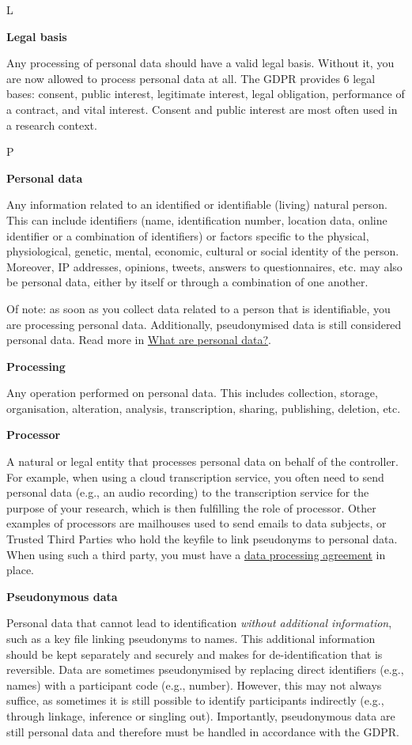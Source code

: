 \documentclass[
]{book}
\begin{document}
L

\textbf{Legal basis}

Any processing of personal data should have a valid legal basis. Without it, you are now allowed to process personal data at all. The GDPR provides 6 legal bases: consent, public interest, legitimate interest, legal obligation, performance of a contract, and vital interest. Consent and public interest are most often used in a research context.

P

\textbf{Personal data}

Any information related to an identified or identifiable (living) natural person. This can include identifiers (name, identification number, location data, online identifier or a combination of identifiers) or factors specific to the physical, physiological, genetic, mental, economic, cultural or social identity of the person. Moreover, IP addresses, opinions, tweets, answers to questionnaires, etc. may also be personal data, either by itself or through a combination of one another.

Of note: as soon as you collect data related to a person that is identifiable, you are processing personal data. Additionally, pseudonymised data is still considered personal data. Read more in \protect\hyperlink{personal-data}{What are personal data?}.

\textbf{Processing}

Any operation performed on personal data. This includes collection, storage, organisation, alteration, analysis, transcription, sharing, publishing, deletion, etc.

\textbf{Processor}

A natural or legal entity that processes personal data on behalf of the controller. For example, when using a cloud transcription service, you often need to send personal data (e.g., an audio recording) to the transcription service for the purpose of your research, which is then fulfilling the role of processor. Other examples of processors are mailhouses used to send emails to data subjects, or Trusted Third Parties who hold the keyfile to link pseudonyms to personal data. When using such a third party, you must have a \protect\hyperlink{data-processing-agreement}{data processing agreement} in place.

\textbf{Pseudonymous data}

Personal data that cannot lead to identification \emph{without additional information}, such as a key file linking pseudonyms to names. This additional information should be kept separately and securely and makes for de-identification that is reversible. Data are sometimes pseudonymised by replacing direct identifiers (e.g., names) with a participant code (e.g., number). However, this may not always suffice, as sometimes it is still possible to identify participants indirectly (e.g., through linkage, inference or singling out). Importantly, pseudonymous data are still personal data and therefore must be handled in accordance with the GDPR.
\end{document}

